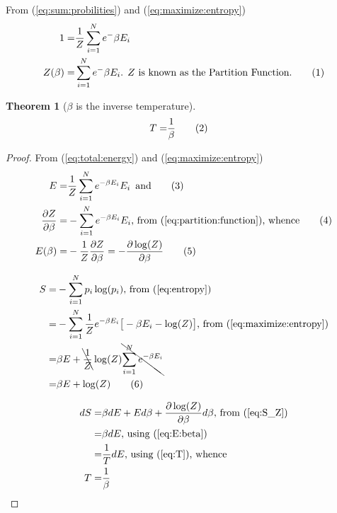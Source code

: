 \documentclass[]{article}
\newcommand\numberthis{\addtocounter{equation}{1}\tag{\theequation}}
\newtheorem{thm}{Theorem}
\begin{document}
From (\ref{eq:sum:probilities}) and (\ref{eq:maximize:entropy})
\begin{align*}
1 =& \frac{1}{Z}  \sum_{i=1}^{N} e^-{\beta E_i}\\
Z(\beta) =& \sum_{i=1}^{N} e^-{\beta E_i} \text{. $Z$ is known as the Partition Function.} \numberthis \label{eq:partition:function}
\end{align*}

\begin{thm}[$\beta$ is the inverse temperature]\label{thm:inverseT}
	\begin{align*}
		T =& \frac{1}{\beta}\numberthis\label{eq:inverseT}
	\end{align*}
\end{thm}

\begin{proof}
	From (\ref{eq:total:energy}) and (\ref{eq:maximize:entropy})
	\begin{align*}
	E =& \frac{1}{Z}  \sum_{i=1}^{N} e^{-\beta E_i} E_i \text{\, and}\numberthis \label{eq:E}\\
	\frac{\partial Z}{\partial \beta} =& - \sum_{i=1}^{N} e^{-\beta E_i} E_i \text{, from (\ref{eq:partition:function}), whence} \numberthis \label{eq:dZ}\\
	E(\beta) =& - \frac{1}{Z} \frac{\partial Z}{\partial \beta} = - \frac{\partial \log(Z)}{\partial \beta} \numberthis \label{eq:E:beta}
	\end{align*}
	
	\begin{align*}
	S =& -\sum_{i=1}^{N} p_i \log(p_i) \text{, from (\ref{eq:entropy})}\\
	=& - \sum_{i=1}^{N} \frac{1}{Z} e^{- \beta E_i}\big[- \beta E_i -\log(Z)\big]\text{, from (\ref{eq:maximize:entropy})}\\
	=& \beta E +  \bcancel{\frac{1}{Z}} \log(Z)  \bcancel{\sum_{i=1}^{N} e^{-\beta E_i}}\\
	=& \beta E +   \log(Z)  \numberthis \label{eq:S_Z}
	\end{align*}
	
	\begin{align*}
	dS =& \beta dE + E d\beta + \frac{\partial \log(Z)}{\partial \beta} d\beta \text{, from (\ref{eq:S_Z})}\\
	=& \beta dE \text{, using (\ref{eq:E:beta})}\\
	=& \frac{1}{T} dE \text{, using (\ref{eq:T})}\text{, whence}\\
	T =& \frac{1}{\beta}
	\end{align*}
\end{proof}
\end{document}
